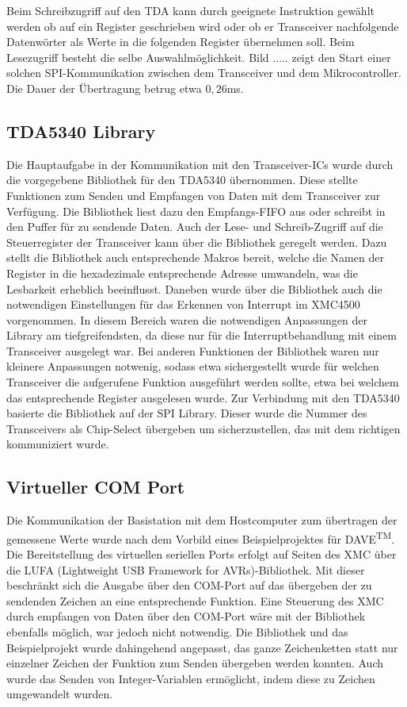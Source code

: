 Beim Schreibzugriff auf den TDA kann durch geeignete Instruktion gewählt werden ob auf ein Register geschrieben wird oder ob er Transceiver nachfolgende Datenwörter als Werte in die folgenden Register übernehmen soll. 
Beim Lesezugriff besteht die selbe Auswahlmöglichkeit. Bild ..... zeigt den Start einer solchen \ac{SPI}-Kommunikation zwischen dem Transceiver und dem Mikrocontroller. Die Dauer der Übertragung betrug etwa $0,26$ms. 







\subsection{TDA5340 Library}
Die Hauptaufgabe in der Kommunikation mit den Transceiver-\acp{IC} wurde durch die vorgegebene Bibliothek für den TDA5340 übernommen. Diese stellte Funktionen zum Senden und Empfangen von Daten mit dem Transceiver zur Verfügung. Die Bibliothek liest dazu den Empfangs-\ac{FIFO} aus oder schreibt in den Puffer für zu sendende Daten. Auch der Lese- und Schreib-Zugriff auf die Steuerregister der Transceiver kann über die Bibliothek geregelt werden. Dazu stellt die Bibliothek auch entsprechende Makros bereit, welche die Namen der Register in die hexadezimale entsprechende Adresse umwandeln, was die Lesbarkeit erheblich beeinflusst. Daneben wurde über die Bibliothek auch die notwendigen  Einstellungen für das Erkennen von Interrupt im XMC4500 vorgenommen. In diesem Bereich waren die notwendigen Anpassungen der Library am tiefgreifendsten, da diese nur für die Interruptbehandlung mit einem Transceiver ausgelegt war. Bei anderen Funktionen der Bibliothek waren nur kleinere Anpassungen notwenig, sodass etwa sichergestellt wurde für welchen Transceiver die aufgerufene Funktion ausgeführt werden sollte, etwa bei welchem das entsprechende Register ausgelesen wurde.
Zur Verbindung mit den TDA5340 basierte die Bibliothek auf der SPI Library. Dieser wurde die Nummer des Transceivers als Chip-Select übergeben um sicherzustellen, das mit dem richtigen kommuniziert wurde.

\subsection{Virtueller COM Port}
Die Kommunikation der Basistation mit dem Hostcomputer zum übertragen der gemessene Werte wurde nach dem Vorbild eines Beispielprojektes für DAVE\textsuperscript{TM}. Die Bereitstellung des virtuellen seriellen Ports erfolgt auf Seiten des XMC über die LUFA (Lightweight USB Framework for AVRs)-Bibliothek. Mit dieser beschränkt sich die Ausgabe über den COM-Port auf das übergeben der zu sendenden Zeichen an eine entsprechende Funktion. Eine Steuerung des XMC durch empfangen von Daten über den COM-Port wäre mit der Bibliothek ebenfalls möglich, war jedoch nicht notwendig.
Die Bibliothek und das Beispielprojekt wurde dahingehend angepasst, das ganze Zeichenketten statt nur einzelner Zeichen der Funktion zum Senden übergeben werden konnten. Auch wurde das Senden von Integer-Variablen ermöglicht, indem diese zu Zeichen umgewandelt wurden. 
